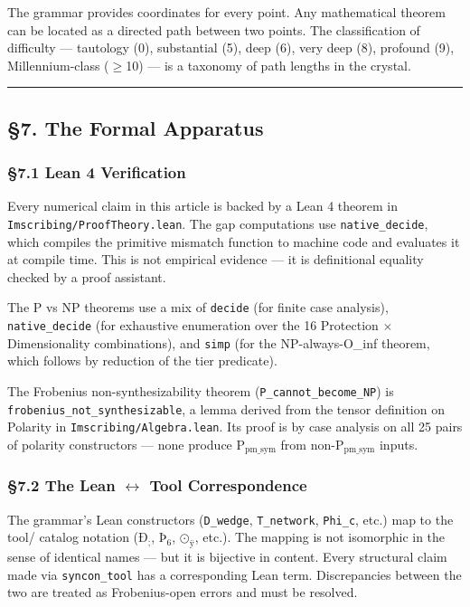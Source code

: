 \documentclass[12pt,a4paper]{article}
\newcommand{\pilcrow}{\S}
\begin{document}
The grammar provides coordinates for every point. Any mathematical theorem can be located as a directed path between two points. The classification of difficulty --- tautology (0), substantial (5), deep (6), very deep (8), profound (9), Millennium-class ($\geq$10) --- is a taxonomy of path lengths in the crystal.

\begin{center}
\rule{0.5\textwidth}{0.4pt}
\end{center}

\subsection{\pilcrow{}7. The Formal Apparatus}

\subsubsection{\pilcrow{}7.1 Lean 4 Verification}

Every numerical claim in this article is backed by a Lean 4 theorem in \texttt{Imscribing/ProofTheory.lean}. The gap computations use \texttt{native\_decide}, which compiles the primitive mismatch function to machine code and evaluates it at compile time. This is not empirical evidence --- it is definitional equality checked by a proof assistant.

The P vs NP theorems use a mix of \texttt{decide} (for finite case analysis), \texttt{native\_decide} (for exhaustive enumeration over the 16 Protection $\times$ Dimensionality combinations), and \texttt{simp} (for the NP-always-O\_inf theorem, which follows by reduction of the tier predicate).

The Frobenius non-synthesizability theorem (\texttt{P\_cannot\_become\_NP}) is \texttt{frobenius\_not\_synthesizable}, a lemma derived from the tensor definition on Polarity in \texttt{Imscribing/Algebra.lean}. Its proof is by case analysis on all 25 pairs of polarity constructors --- none produce $\text{P}_{\text{pm\_sym}}$ from non-$\text{P}_{\text{pm\_sym}}$ inputs.

\subsubsection{\pilcrow{}7.2 The Lean $\leftrightarrow$ Tool Correspondence}

The grammar's Lean constructors (\texttt{D\_wedge}, \texttt{T\_network}, \texttt{Phi\_c}, etc.) map to the tool/ catalog notation ($\text{Ð}_{\text{;}}$, $\text{Þ}_{\text{6}}$, $\text{⊙}_{\text{ÿ}}$, etc.). The mapping is not isomorphic in the sense of identical names --- but it is bijective in content. Every structural claim made via \texttt{syncon\_tool} has a corresponding Lean term. Discrepancies between the two are treated as Frobenius-open errors and must be resolved.
\end{document}
